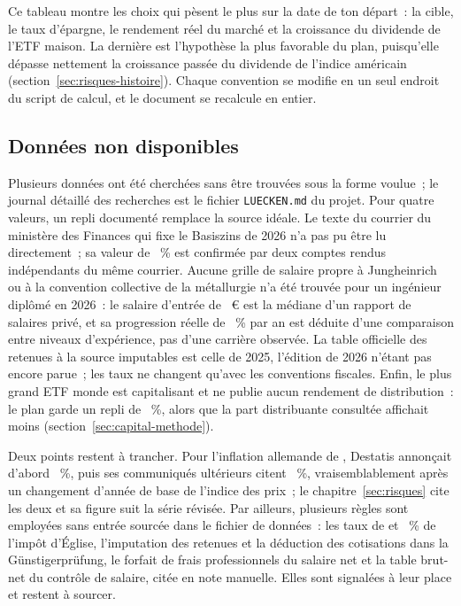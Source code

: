 Ce tableau montre les choix qui p\`esent le plus sur la date de ton d\'epart~: la cible, le taux
d'\'epargne, le rendement r\'eel du march\'e et la croissance du dividende de l'ETF maison. La
derni\`ere est l'hypoth\`ese la plus favorable du plan, puisqu'elle d\'epasse nettement la croissance
pass\'ee du dividende de l'indice am\'ericain (section~\ref{sec:risques-histoire}). Chaque convention
se modifie en un seul endroit du script de calcul, et le document se recalcule en entier.

\subsection{Donn\'ees non disponibles}\label{sec:annexe-lacunes}

Plusieurs donn\'ees ont \'et\'e cherch\'ees sans \^etre trouv\'ees sous la forme voulue~; le journal
d\'etaill\'e des recherches est le fichier \texttt{LUECKEN.md} du projet. Pour quatre valeurs, un
repli document\'e remplace la source id\'eale. Le texte du courrier du minist\`ere des
Finances qui fixe le Basiszins de 2026 n'a pas pu \^etre lu directement~; sa valeur de \Basiszins~\%
est confirm\'ee par deux comptes rendus ind\'ependants du m\^eme courrier. Aucune grille de salaire
propre \`a Jungheinrich ou \`a la convention collective de la m\'etallurgie n'a \'et\'e trouv\'ee pour un
ing\'enieur dipl\^om\'e en 2026~: le salaire d'entr\'ee de \GehaltBrutEntree~€ est la m\'ediane d'un
rapport de salaires priv\'e, et sa progression r\'eelle de \GehaltWachstum~\% par an est d\'eduite
d'une comparaison entre niveaux d'exp\'erience, pas d'une carri\`ere observ\'ee. La table officielle des
retenues \`a la source imputables est celle de 2025, l'\'edition de 2026 n'\'etant pas encore parue~;
les taux ne changent qu'avec les conventions fiscales. Enfin, le plus grand ETF monde est capitalisant
et ne publie aucun rendement de distribution~: le plan garde un repli de \RenditeDivEtf~\%, alors que
la part distribuante consult\'ee affichait moins (section~\ref{sec:capital-methode}).

Deux points restent \`a trancher. Pour l'inflation allemande de \InflationPicAnnee, Destatis annon\c{c}ait
d'abord \InflationPicProvisoire~\%, puis ses communiqu\'es ult\'erieurs citent \InflationPicRevisee~\%,
vraisemblablement apr\`es un changement d'ann\'ee de base de l'indice des prix~; le
chapitre~\ref{sec:risques} cite les deux et sa figure suit la s\'erie r\'evis\'ee. Par ailleurs,
plusieurs r\`egles sont employ\'ees sans entr\'ee sourc\'ee dans le fichier de donn\'ees~: les taux de
\KistAcht{} et \KistNeun~\% de l'imp\^ot d'\'Eglise, l'imputation des retenues et la d\'eduction des
cotisations dans la G\"unstigerpr\"ufung, le forfait de frais professionnels du salaire net et la table
brut-net du contr\^ole de salaire, cit\'ee en note manuelle. Elles sont signal\'ees \`a leur place et
restent \`a sourcer.

